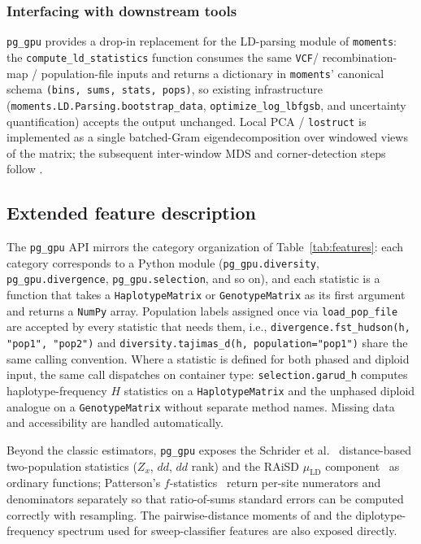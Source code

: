 \documentclass[12pt]{article}
\newcommand{\citep}{\parencite}
\newcommand{\citet}{\textcite}
\newcommand{\pggpu}{\texttt{pg\_gpu}\xspace}
\newcommand{\moments}{\texttt{moments}\xspace}
\newcommand{\numpy}{\texttt{NumPy}\xspace}
\newcommand{\vcf}{\texttt{VCF}\xspace}
\newcommand{\lostruct}{\texttt{lostruct}\xspace}
\begin{document}
\subsubsection*{Interfacing with downstream tools}

\pggpu provides a drop-in replacement for the LD-parsing module of
\moments \citep{ragsdale2019}: the \texttt{compute\_ld\_statistics}
function consumes the same \vcf / recombination-map / population-file
inputs and returns a dictionary in \moments' canonical schema
\texttt{(bins, sums, stats, pops)}, so existing infrastructure
(\texttt{moments.\allowbreak LD.\allowbreak Parsing.\allowbreak bootstrap\_data}, \texttt{optimize\_log\_lbfgsb},
and uncertainty quantification) accepts the output unchanged. Local PCA
/ \lostruct \citep{li2019} is implemented as a single batched-Gram
eigendecomposition over windowed views of the matrix; the subsequent
inter-window MDS and corner-detection steps follow \citet{li2019}.

\clearpage

\subsection*{Extended feature description}

The \pggpu API mirrors the category organization of
Table~\ref{tab:features}: each category corresponds to a Python module
(\texttt{pg\_gpu.diversity}, \texttt{pg\_gpu.divergence},
\texttt{pg\_gpu.selection}, and so on), and each statistic is a
function that takes a \texttt{HaplotypeMatrix} or
\texttt{GenotypeMatrix} as its first argument and returns a \numpy
array. Population labels assigned once via \texttt{load\_pop\_file} are
accepted by every statistic that needs them, i.e.,
\texttt{divergence.fst\_hudson(h, "pop1", "pop2")} and
\texttt{diversity.tajimas\_d(h, population="pop1")} share the same
calling convention. Where a statistic is defined for both phased and
diploid input, the same call dispatches on container type:
\texttt{selection.garud\_h} computes haplotype-frequency $H$ statistics
on a \texttt{HaplotypeMatrix} and the unphased diploid analogue on a
\texttt{GenotypeMatrix} without separate method names. Missing data and
accessibility are handled automatically.

Beyond the classic estimators, \pggpu exposes the
Schrider et al.~\citep{schrider2018} distance-based two-population
statistics ($Z_x$, $dd$, $dd$ rank) and the RAiSD
$\mu_{\mathrm{LD}}$ component~\citep{alachiotis2018} as ordinary
functions; Patterson's $f$-statistics~\citep{patterson2012} return
per-site numerators and denominators separately so that ratio-of-sums
standard errors can be computed correctly with resampling. The
pairwise-distance moments of \citet{schrider2018} and the
diplotype-frequency spectrum used for sweep-classifier features are
also exposed directly.
\end{document}
